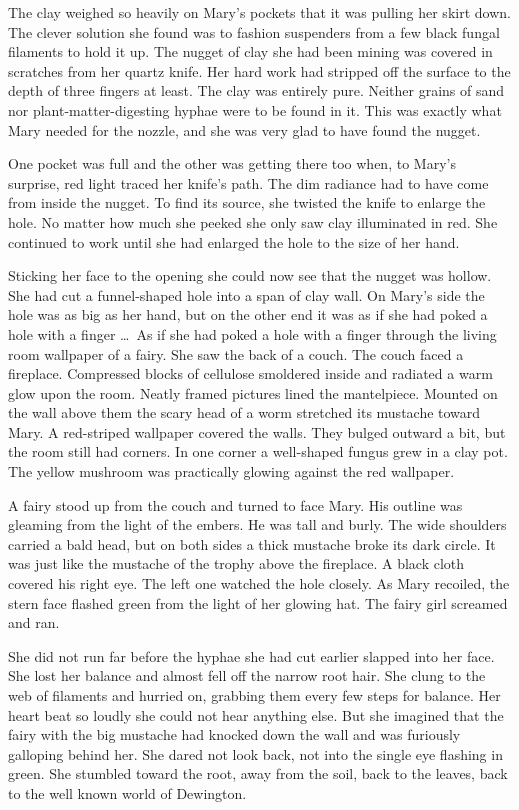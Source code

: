 \documentclass[10pt]{memoir}
\begin{document}
The clay weighed so heavily on Mary's pockets that it was pulling her skirt
down. The clever solution she found was to fashion suspenders from a few black
fungal filaments to hold it up. The nugget of clay she had been mining was
covered in scratches from her quartz knife. Her hard work had stripped off the
surface to the depth of three fingers at least. The clay was entirely pure.
Neither grains of sand nor plant-matter-digesting hyphae were to be found in
it. This was exactly what Mary needed for the nozzle, and she was very glad to
have found the nugget.

One pocket was full and the other was getting there too when, to Mary's
surprise, red light traced her knife's path. The dim radiance had to have come
from inside the nugget. To find its source, she twisted the knife to enlarge
the hole. No matter how much she peeked she only saw clay illuminated in red.
She continued to work until she had enlarged the hole to the size of her hand.

Sticking her face to the opening she could now see that the nugget was hollow.
She had cut a funnel-shaped hole into a span of clay wall. On Mary's side the
hole was as big as her hand, but on the other end it was as if she had poked a
hole with a finger \dots\ As if she had poked a hole with a finger through the living
room wallpaper of a fairy. She saw the back of a couch. The couch faced a
fireplace. Compressed blocks of cellulose smoldered inside and radiated a warm
glow upon the room. Neatly framed pictures lined the mantelpiece. Mounted on
the wall above them the scary head of a worm stretched its mustache toward
Mary. A red-striped wallpaper covered the walls. They bulged outward a bit, but
the room still had corners. In one corner a well-shaped fungus grew in a clay
pot. The yellow mushroom was practically glowing against the red wallpaper.

A fairy stood up from the couch and turned to face Mary. His outline was
gleaming from the light of the embers. He was tall and burly. The wide
shoulders carried a bald head, but on both sides a thick mustache broke its
dark circle. It was just like the mustache of the trophy above the fireplace.
A black cloth covered his right eye. The left one watched the hole closely. As
Mary recoiled, the stern face flashed green from the light of her glowing hat.
The fairy girl screamed and ran.

She did not run far before the hyphae she had cut earlier slapped into her
face. She lost her balance and almost fell off the narrow root hair. She clung
to the web of filaments and hurried on, grabbing them every few steps for
balance. Her heart beat so loudly she could not hear anything else. But she
imagined that the fairy with the big mustache had knocked down the wall and was
furiously galloping behind her. She dared not look back, not into the single
eye flashing in green. She stumbled toward the root, away from the soil, back
to the leaves, back to the well known world of Dewington.
\end{document}
